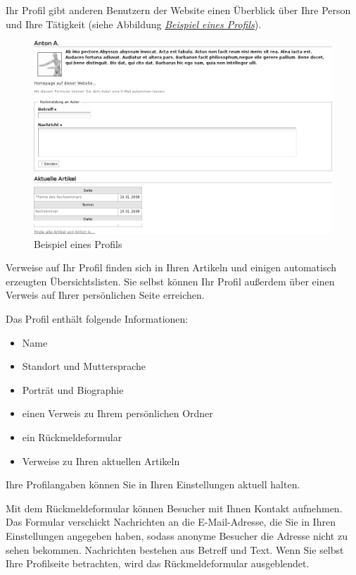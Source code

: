 \documentclass[a4paper,12pt,ngerman]{manual}
\begin{document}
Ihr Profil gibt anderen Benutzern der Website einen Überblick über
Ihre Person und Ihre Tätigkeit (siehe Abbildung \hyperlink{fig-profil}{\emph{Beispiel eines Profils}}).
\hypertarget{fig-profil}{}\begin{figure}[htbp]
\centering

\includegraphics{profil.png}
\caption{Beispiel eines Profils}\end{figure}

Verweise auf Ihr Profil finden sich in Ihren Artikeln und einigen
automatisch erzeugten Übersichtslisten. Sie selbst können Ihr Profil
außerdem über einen Verweis auf Ihrer persönlichen Seite erreichen.

Das Profil enthält folgende Informationen:
\begin{itemize}
\item {} 
Name

\item {} 
Standort und Muttersprache

\item {} 
Porträt und Biographie

\item {} 
einen Verweis zu Ihrem persönlichen Ordner

\item {} 
ein Rückmeldeformular

\item {} 
Verweise zu Ihren aktuellen Artikeln

\end{itemize}

Ihre Profilangaben können Sie in Ihren Einstellungen aktuell halten.

Mit dem Rückmeldeformular können Besucher mit Ihnen Kontakt aufnehmen. Das
Formular verschickt Nachrichten an die E-Mail-Adresse, die Sie in Ihren
Einstellungen angegeben haben, sodass anonyme Besucher die Adresse nicht zu
sehen bekommen. Nachrichten bestehen aus Betreff und Text. Wenn Sie selbst
Ihre Profilseite betrachten, wird das Rückmeldeformular ausgeblendet.
\end{document}
